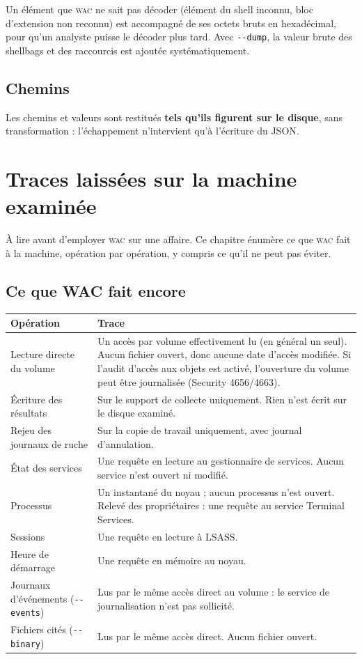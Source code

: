 \documentclass[11pt,a4paper,oneside]{report}
\newcommand{\wac}{\textsc{wac}}
\newcommand{\opt}[1]{\texttt{-{}-#1}}
\begin{document}
Un élément que \wac{} ne sait pas décoder (élément du shell inconnu, bloc
d'extension non reconnu) est accompagné de ses octets bruts en hexadécimal, pour
qu'un analyste puisse le décoder plus tard. Avec \opt{dump}, la valeur brute des
shellbags et des raccourcis est ajoutée systématiquement.

\section{Chemins}

Les chemins et valeurs sont restitués \textbf{tels qu'ils figurent sur le
disque}, sans transformation : l'échappement n'intervient qu'à l'écriture du
JSON.

\chapter{Traces laissées sur la machine examinée}\label{chap:traces}

À lire avant d'employer \wac{} sur une affaire. Ce chapitre énumère ce que \wac{}
fait à la machine, opération par opération, y compris ce qu'il ne peut pas
éviter.

\section{Ce que WAC fait encore}

\begin{longtable}{@{}L{4.3cm}L{10.1cm}@{}}
\toprule
\bfseries Opération & \bfseries Trace \\
\midrule
\endhead
Lecture directe du volume & Un accès par volume effectivement lu (en général un
  seul). Aucun fichier ouvert, donc aucune date d'accès modifiée. Si l'audit
  d'accès aux objets est activé, l'ouverture du volume peut être journalisée
  (Security 4656/4663). \\
Écriture des résultats & Sur le support de collecte uniquement. Rien n'est écrit
  sur le disque examiné. \\
Rejeu des journaux de ruche & Sur la copie de travail uniquement, avec journal
  d'annulation. \\
État des services & Une requête en lecture au gestionnaire de services. Aucun
  service n'est ouvert ni modifié. \\
Processus & Un instantané du noyau ; aucun processus n'est ouvert. Relevé des
  propriétaires : une requête au service Terminal Services. \\
Sessions & Une requête en lecture à LSASS. \\
Heure de démarrage & Une requête en mémoire au noyau. \\
Journaux d'événements (\opt{events}) & Lus par le même accès direct au volume :
  le service de journalisation n'est pas sollicité. \\
Fichiers cités (\opt{binary}) & Lus par le même accès direct. Aucun fichier
  ouvert. \\
\bottomrule
\end{longtable}
\end{document}
